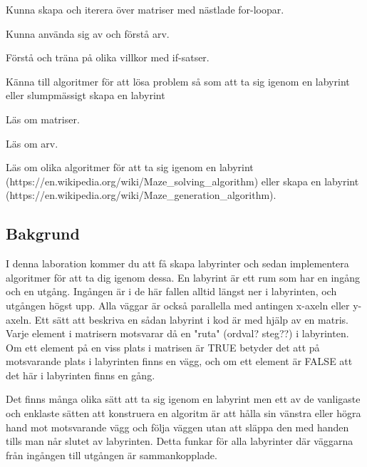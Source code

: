 

\Lab{\LabWeekNINE}

\begin{Goals}
\item Kunna skapa och iterera över matriser med nästlade for-loopar.
\item Kunna använda sig av och förstå arv.
\item Förstå och träna på olika villkor med if-satser.
\item Känna till algoritmer för att lösa problem så som att ta sig igenom en labyrint eller slumpmässigt skapa en labyrint
\end{Goals}

\begin{Preparations}
\item Läs om matriser.
\item Läs om arv.
\item Läs om olika algoritmer för att ta sig igenom en labyrint (https://en.wikipedia.org/wiki/Maze_solving_algorithm) eller skapa en labyrint (https://en.wikipedia.org/wiki/Maze_generation_algorithm).
\end{Preparations}

\subsection{Bakgrund}
I denna laboration kommer du att få skapa labyrinter och sedan implementera algoritmer för att ta dig igenom dessa. En labyrint är ett rum som har en ingång och en utgång. Ingången är i de här fallen alltid längst ner i labyrinten, och utgången högst upp. Alla väggar är också parallella med antingen x-axeln eller y-axeln. Ett sätt att beskriva en sådan labyrint i kod är med hjälp av en matris. Varje element i matrisern motsvarar då en "ruta" (ordval? steg??) i labyrinten. Om ett element på en viss plats i matrisen är TRUE betyder det att på motsvarande plats i labyrinten finns en vägg, och om ett element är FALSE att det här i labyrinten finns en gång.

Det finns många olika sätt att ta sig igenom en labyrint men ett av de vanligaste och enklaste sätten att konstruera en algoritm är att hålla sin vänstra eller högra hand mot motsvarande vägg och följa väggen utan att släppa den med handen tills man når slutet av labyrinten. Detta funkar för alla labyrinter där väggarna från ingången till utgången är sammankopplade.

